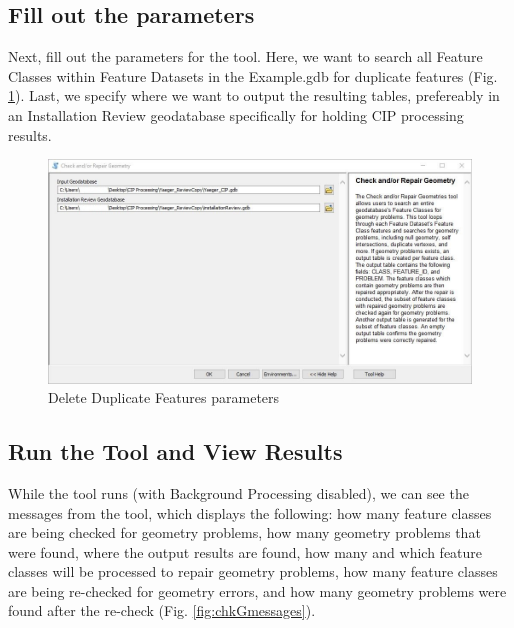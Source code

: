 \documentclass[openany]{book}
\theoremstyle{definition}
\theoremstyle{definition}
\theoremstyle{definition}
\theoremstyle{remark}
\begin{document}
\subsection{Fill out the parameters}\label{fill-out-the-parameters-5}

Next, fill out the parameters for the tool. Here, we want to search all
Feature Classes within Feature Datasets in the Example.gdb for duplicate
features (Fig. \ref{fig:chkGparams}). Last, we specify where we want to
output the resulting tables, prefereably in an Installation Review
geodatabase specifically for holding CIP processing results.\\

\begin{figure}[H]

{\centering \includegraphics{figures/chkG-params} 

}

\caption{Delete Duplicate Features parameters}\label{fig:chkGparams}
\end{figure}

\subsection{Run the Tool and View
Results}\label{run-the-tool-and-view-results-5}

While the tool runs (with Background Processing disabled), we can see
the messages from the tool, which displays the following: how many
feature classes are being checked for geometry problems, how many
geometry problems that were found, where the output results are found,
how many and which feature classes will be processed to repair geometry
problems, how many feature classes are being re-checked for geometry
errors, and how many geometry problems were found after the re-check
(Fig. \ref{fig:chkGmessages}).
\end{document}
